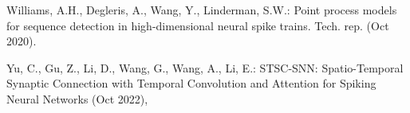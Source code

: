 \documentclass[runningheads]{llncs}
\begin{document}
{\begin{thebibliography}{10}
Williams, A.H., Degleris, A., Wang, Y., Linderman, S.W.: Point process models
  for sequence detection in high-dimensional neural spike trains. Tech. rep.
  (Oct 2020). %

Yu, C., Gu, Z., Li, D., Wang, G., Wang, A., Li, E.: {STSC}-{SNN}:
  {Spatio}-{Temporal} {Synaptic} {Connection} with {Temporal} {Convolution} and
  {Attention} for {Spiking} {Neural} {Networks} (Oct 2022),

\end{thebibliography}
}
\end{document}
